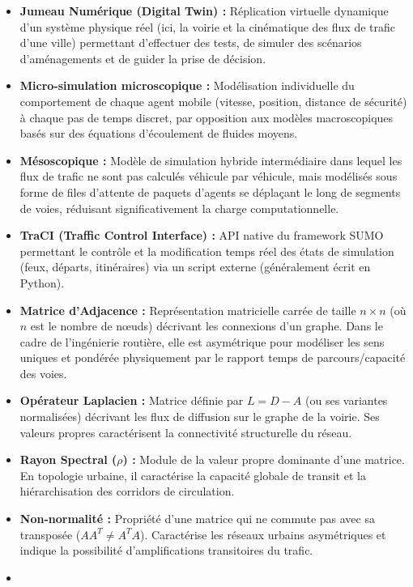 \documentclass[10pt, a4paper]{article}
\providecommand{\tightlist}{}
\begin{document}
\begin{itemize}
\tightlist
\item
  \textbf{Jumeau Numérique (Digital Twin) :} Réplication virtuelle
  dynamique d'un système physique réel (ici, la voirie et la cinématique
  des flux de trafic d'une ville) permettant d'effectuer des tests, de
  simuler des scénarios d'aménagements et de guider la prise de
  décision.
\item
  \textbf{Micro-simulation microscopique :} Modélisation individuelle du
  comportement de chaque agent mobile (vitesse, position, distance de
  sécurité) à chaque pas de temps discret, par opposition aux modèles
  macroscopiques basés sur des équations d'écoulement de fluides moyens.
\item
  \textbf{Mésoscopique :} Modèle de simulation hybride intermédiaire
  dans lequel les flux de trafic ne sont pas calculés véhicule par
  véhicule, mais modélisés sous forme de files d'attente de paquets
  d'agents se déplaçant le long de segments de voies, réduisant
  significativement la charge computationnelle.
\item
  \textbf{TraCI (Traffic Control Interface) :} API native du framework
  SUMO permettant le contrôle et la modification temps réel des états de
  simulation (feux, départs, itinéraires) via un script externe
  (généralement écrit en Python).
\item
  \textbf{Matrice d'Adjacence :} Représentation matricielle carrée de
  taille \(n \times n\) (où \(n\) est le nombre de nœuds) décrivant les
  connexions d'un graphe. Dans le cadre de l'ingénierie routière, elle
  est asymétrique pour modéliser les sens uniques et pondérée
  physiquement par le rapport temps de parcours/capacité des voies.
\item
  \textbf{Opérateur Laplacien :} Matrice définie par \(L = D - A\) (ou
  ses variantes normalisées) décrivant les flux de diffusion sur le
  graphe de la voirie. Ses valeurs propres caractérisent la connectivité
  structurelle du réseau.
\item
  \textbf{Rayon Spectral (\(\rho\)) :} Module de la valeur propre
  dominante d'une matrice. En topologie urbaine, il caractérise la
  capacité globale de transit et la hiérarchisation des corridors de
  circulation.
\item
  \textbf{Non-normalité :} Propriété d'une matrice qui ne commute pas
  avec sa transposée (\(A A^T \neq A^T A\)). Caractérise les réseaux
  urbains asymétriques et indique la possibilité d'amplifications
  transitoires du trafic.
\item

\end{itemize}
\end{document}
